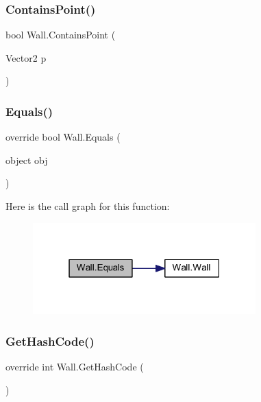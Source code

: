 \subsubsection{\texorpdfstring{Contains\+Point()}{ContainsPoint()}}
{\footnotesize\ttfamily bool Wall.\+Contains\+Point (\begin{DoxyParamCaption}\item[{Vector2}]{p }\end{DoxyParamCaption})}

\mbox{\label{class_wall_a1f2892cd73109765a83ddeda382309eb}} 
\subsubsection{\texorpdfstring{Equals()}{Equals()}}
{\footnotesize\ttfamily override bool Wall.\+Equals (\begin{DoxyParamCaption}\item[{object}]{obj }\end{DoxyParamCaption})}

Here is the call graph for this function\+:
\nopagebreak
\begin{figure}[H]
\begin{center}
\leavevmode
\includegraphics[width=244pt]{class_wall_a1f2892cd73109765a83ddeda382309eb_cgraph}
\end{center}
\end{figure}
\mbox{\label{class_wall_a4c40b2b1afaf636c50cc2ff7597442e9}} 
\subsubsection{\texorpdfstring{Get\+Hash\+Code()}{GetHashCode()}}
{\footnotesize\ttfamily override int Wall.\+Get\+Hash\+Code (\begin{DoxyParamCaption}{ }\end{DoxyParamCaption})}

